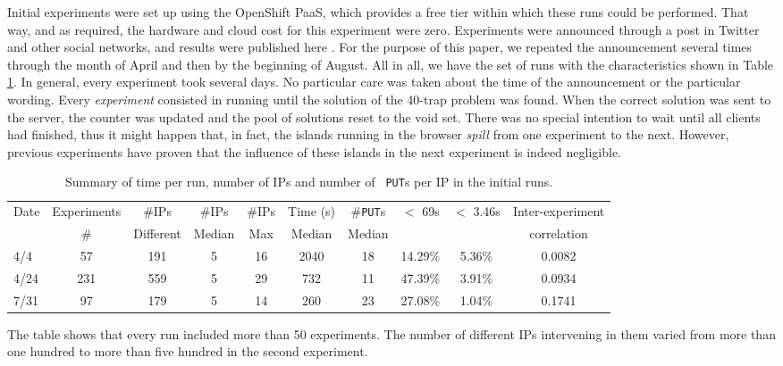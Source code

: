 \documentclass[journal,onecolumn]{IEEEtran}
\begin{document}
Initial experiments were set up using the OpenShift
PaaS, which provides a free tier within which these runs could be performed. That way, and as required, the hardware
and cloud cost for this experiment were zero. Experiments were
announced through a post in Twitter and other social networks, and
results were published here \cite{DBLP:conf/gecco/GuervosG15}. For the
purpose of this paper, we repeated the announcement several times
through the month of April and then by the beginning of August. All
in all, we have the set of runs with the characteristics shown in
Table \ref{tab:summary:os}. In general, every experiment took several
days. No particular care was taken about the time of the announcement
or the particular wording. Every {\em experiment} consisted in running
until the solution of the 40-trap problem was found. When the correct
solution was sent to the server, the counter was updated and the pool
of solutions reset to the void set. There was no special intention to wait
until all clients had finished, thus it might happen that, in fact,
the islands running in the browser {\em spill} from one experiment to
the next. However, previous experiments have proven that the influence
of these islands in the next experiment is indeed negligible.
%
\begin{table}
\caption{Summary of time per run, number of IPs and number of {\tt
    PUT}s per IP in the initial runs. \label{tab:summary:os}}
\begin{center}
\begin{tabular}{l|ccccccccc}
\hline
Date & Experiments &\#IPs &\#IPs &  \#IPs & Time (s) &  \#{\tt PUT}s & $<$ 69s & $<$ 3.46s & Inter-experiment\\
     & \# & Different & Median & Max & Median &  Median & & & correlation \\ 
\hline
4/4 & 57 & 191 & 5 & 16 & 2040 & 18 & 14.29\% & 5.36\% & 0.0082 \\
4/24 & 231 & 559 & 5 & 29 & 732 & 11 & 47.39\% & 3.91\% & 0.0934\\
7/31 & 97 & 179 & 5 & 14 & 260 & 23 & 27.08\% & 1.04\%  & 0.1741\\
\hline
\end{tabular}
\end{center}
\end{table}
%
The table shows that every run included more than 50 experiments. The
number of different IPs intervening in them varied from more than one
hundred to more than five hundred in the second experiment.
\end{document}
